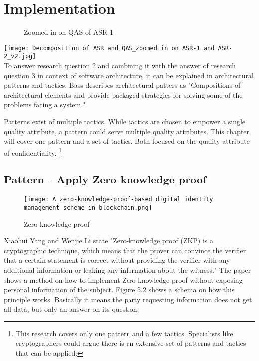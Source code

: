 \chapter{Implementation}\label{s:implementation}
\graphicspath{ {./images/} }
\begin{figure}[t]
\centering
\caption{Zoomed in on QAS of ASR-1}
\label{fig:ASR2}
\end{figure}
\texttt{[image: Decomposition of ASR and QAS\_zoomed in on ASR-1 and ASR-2\_v2.jpg]}\\

To answer research question 2 and combining it with the answer of research question 3 in context of software architecture, it can be explained in architectural patterns and tactics. Bass \etal \cite{Bass2015SoftwareAI} describes architectural patters as "Compositions of architectural elements and provide packaged strategies for solving some of the problems facing a system."

Patterns exist of multiple tactics. While tactics are chosen to empower a single quality attribute, a pattern could serve multiple quality attributes. This chapter will cover one pattern and a set of tactics. Both focused on the quality attribute of confidentiality.
\footnote{This research covers only one pattern and a few tactics. Specialists like cryptographers could argue there is an extensive set of patterns and tactics that can be applied.}

\section{Pattern - Apply Zero-knowledge proof}
\graphicspath{ {./images/} }
\begin{figure}[t]
\centering
\label{fig:ZKP}
\texttt{[image: A zero-knowledge-proof-based digital identity management scheme in blockchain.png]}\\
\caption{Zero knowledge proof}
\end{figure}

Xiaohui Yang and Wenjie Li\cite{YANG2020102050} state "Zero-knowledge proof (ZKP) is a cryptographic technique,
which means that the prover can convince the verifier that a certain statement is correct without providing the verifier with any additional information or leaking any information about the witness." The paper shows a method on how to implement Zero-knowledge proof without exposing personal information of the subject. Figure 5.2 shows a schema on how this principle works. Basically it means the party requesting information does not get all data, but only an answer on its question.

